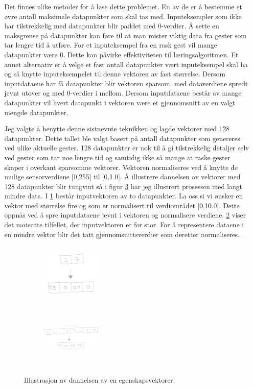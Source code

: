 Det finnes ulike metoder for å løse dette problemet. En av de er å bestemme et øvre antall maksimale datapunkter som skal tas med. Inputeksempler som ikke har tilstrekkelig med datapunkter blir paddet med 0-verdier. Å sette en maksgrense på datapunkter kan føre til at man mister viktig data fra gester som tar lengre tid å utføre. For et inputeksempel fra en rask gest vil mange datapunkter være 0. Dette kan påvirke effektiviteten til læringsalgoritmen. Et annet alternativ er å velge et fast antall datapunkter vært inputeksempel skal ha og så knytte inputeksempelet til denne vektoren av fast størrelse. Dersom inputdataene har få datapunkter blir vektoren sparsom, med dataverdiene spredt jevnt utover og med 0-verdier i mellom. Dersom inputdataene består av mange datapunkter vil hvert datapunkt i vektoren være et gjennomsnitt av en valgt mengde datapunkter.

Jeg valgte å benytte denne sistnevnte teknikken og lagde vektorer med 128 datapunkter. Dette tallet ble valgt basert på antall datapunkter som genereres ved ulike aktuelle gester. 128 datapunkter er nok til å gi tilstrekkelig detaljer selv ved gester som tar noe lengre tid og samtidig ikke så mange at raske gester skaper i overkant sparsomme vektorer. Vektoren normaliseres ved å knytte de mulige sensorverdiene [0,255] til [0,1.0]. Å illustrere dannelsen av vektorer med 128 datapunkter blir tungvint så i figur \ref{fig:data} har jeg illustrert prosessen med langt mindre data. I \ref{fig:few} består inputvektoren av to datapunkter. La oss si vi ønsker en vektor med størrelse fire og som er normalisert til verdiområdet [0,10.0]. Dette oppnås ved å spre inputdataene jevnt i vektoren og normalisere verdiene. \ref{fig:many} viser det motsatte tilfellet, der inputvektoren er for stor. For å representere dataene i en mindre vektor blir det tatt gjennomsnittsverdier som deretter normaliseres. 

\begin{figure}[h]
\centering
\begin{subfigure}{0.23\textwidth}
\includegraphics[width=3cm, height=3cm]{fig/few-to-many}
\caption{}
\label{fig:few}
\end{subfigure}
\begin{subfigure}{0.23\textwidth}
\includegraphics[width=3cm, height=3cm]{fig/many-to-few}
\caption{}
\label{fig:many}
\end{subfigure}
\caption{Illustrasjon av dannelsen av en egenskapsvektorer.}
\label{fig:data}
\end{figure}

